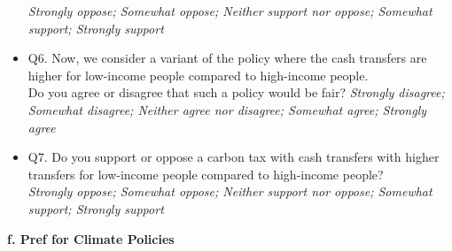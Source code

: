 \documentclass{article}
\begin{document}
\begin{itemize}
    \textit{Strongly oppose; Somewhat oppose; Neither support nor oppose; Somewhat support; Strongly support}
    \item Q6. Now, we consider a variant of the policy where the cash transfers are higher for low-income people compared to high-income people. \\
    Do you agree or disagree that such a policy would be fair?
    \textit{Strongly disagree; Somewhat disagree; Neither agree nor disagree; Somewhat agree; Strongly agree}
    \item Q7. Do you support or oppose a carbon tax with cash transfers with higher transfers for low-income people compared to high-income people? \\
    \textit{Strongly oppose; Somewhat oppose; Neither support nor oppose; Somewhat support; Strongly support}
\end{itemize}

\begin{flushleft}
\textbf{f. Pref for Climate Policies}
\end{flushleft}
\end{document}
